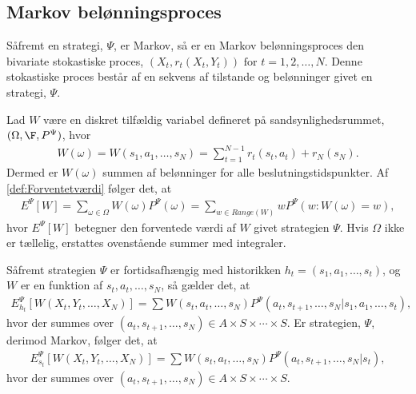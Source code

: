 \subsection{Markov belønningsproces}
Såfremt en strategi, $\Psi$, er Markov, så er en Markov belønningsproces den bivariate stokastiske proces, $\left(X_t, r_t(X_t,Y_t) \right)\text{ for } t=1,2,\ldots,N$. Denne stokastiske proces består af en sekvens af tilstande og belønninger givet en strategi, $\Psi$.

Lad $W$ være en diskret tilfældig variabel defineret på sandsynlighedsrummet, $(\Omega, \F, P^{\Psi})$, hvor
\vspace{-0.4cm}
\begin{align*}
    W(\omega)=W(s_1 , a_1 , \dots , s_N) = \sum_{t=1}^{N-1} r_t(s_t,a_t) + r_N(s_N).
\end{align*} 
Dermed er $W(\omega)$ summen af belønninger for alle beslutningstidspunkter. Af \autoref{def:Forventetværdi} følger det, at
\begin{align*}
    E^\Psi [W] = \sum_{\omega \in \Omega} W(\omega)P^\Psi\left(\omega\right) = \sum_{w \in Range(W)} w P^\Psi \left(w: W(\omega) = w\right), 
\end{align*}
hvor $E^\Psi[W]$ betegner den forventede værdi af $W$ givet strategien $\Psi$. Hvis $\Omega$ ikke er tællelig, erstattes ovenstående summer med integraler.

Såfremt strategien $\Psi$ er fortidsafhængig med historikken $h_t=(s_1, a_1 , \dots , s_t)$, og $W$ er en funktion af $s_t, a_t,\dots, s_N$, så gælder det, at
\begin{align}\label{eq:forventet_belønning_fortidsafhængig}
    E_{h_t}^\Psi \left[W(X_t , Y_t , \dots , X_N) \right] = \sum W(s_t , a_t , \dots , s_N) P^\Psi (a_t , s_{t+1} , \dots , s_N | s_1 , a_1 , \dots , s_t),
\end{align}
hvor der summes over $(a_t , s_{t+1} , \dots , s_N) \in A \times S \times \cdots \times S$. Er strategien, $\Psi$, derimod Markov, følger det, at
\begin{align*}
     E_{s_t}^\Psi \left[W(X_t , Y_t , \dots , X_N) \right] = \sum W(s_t , a_t , \dots , s_N) P^\Psi (a_t , s_{t+1} , \dots , s_N | s_t),
\end{align*}
hvor der summes over $(a_t , s_{t+1} , \dots , s_N) \in A \times S \times \cdots \times S$.
